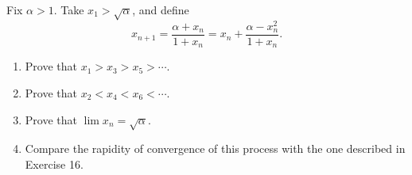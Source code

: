 \documentclass[main.tex]{subfiles}
\begin{document}
Fix $\alpha > 1$. Take $x_{1} > \sqrt{\alpha}$, and define
\[
x_{n+1} = \frac{\alpha + x_{n}}{1 + x_{n}} = x_{n} + \frac{\alpha - x_{n}^{2}}{1 + x_{n}}.
\]
\begin{enumerate}[leftmargin=1.7em,itemsep=2pt,topsep=2pt,label=\textnormal{(\alph*)}]
  \item Prove that $x_{1} > x_{3} > x_{5} > \cdots$.
  \item Prove that $x_{2} < x_{4} < x_{6} < \cdots$.
  \item Prove that $\lim x_{n} = \sqrt{\alpha}$.
  \item Compare the rapidity of convergence of this process with the one described in Exercise 16.
\end{enumerate}
\end{document}
